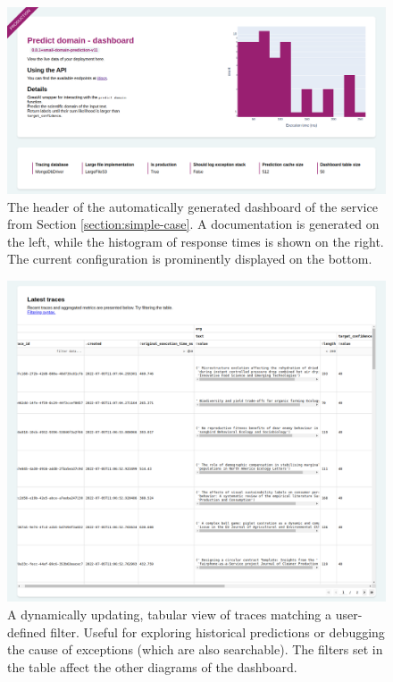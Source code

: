 \begin{figure}
    \centering
    \includegraphics[width=1\linewidth]{figures/greatai-header.png}
    \captionsetup{width=.9\linewidth}
    \caption{The header of the automatically generated dashboard of the service from Section \ref{section:simple-case}. A documentation is generated on the left, while the histogram of response times is shown on the right. The current configuration is prominently displayed on the bottom.}
    \label{fig:greatai-header}
\end{figure}

\begin{figure}
    \centering
    \includegraphics[width=1\textwidth]{figures/greatai-table.png}
    \captionsetup{width=.9\linewidth}
    \caption{A dynamically updating, tabular view of traces matching a user-defined filter. Useful for exploring historical predictions or debugging the cause of exceptions (which are also searchable). The filters set in the table affect the other diagrams of the dashboard.}
    \label{fig:greatai-table}
\end{figure}

